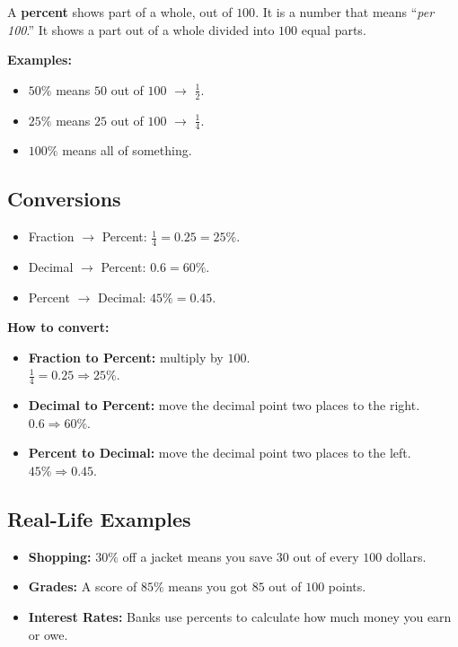 A \textbf{percent} shows part of a whole, out of \(100\). It is a number that means
``\emph{per 100}.'' It shows a part out of a whole divided into \(100\) equal parts.

\textbf{Examples:}
\begin{itemize}
  \item \(50\%\) means \(50\) out of \(100\) \(\rightarrow\) \(\frac{1}{2}\).
  \item \(25\%\) means \(25\) out of \(100\) \(\rightarrow\) \(\frac{1}{4}\).
  \item \(100\%\) means all of something.
\end{itemize}

\subsection{Conversions}

\begin{itemize}
  \item Fraction \(\rightarrow\) Percent: \(\displaystyle \frac{1}{4}=0.25=25\%\).
  \item Decimal \(\rightarrow\) Percent: \(0.6 = 60\%\).
  \item Percent \(\rightarrow\) Decimal: \(45\% = 0.45\).
\end{itemize}

\textbf{How to convert:}
\begin{itemize}
  \item \textbf{Fraction to Percent:} multiply by \(100\).\\
    \(\displaystyle \frac{1}{4}=0.25 \Rightarrow 25\%\).
  \item \textbf{Decimal to Percent:} move the decimal point two places to the right.\\
    \(0.6 \Rightarrow 60\%\).
  \item \textbf{Percent to Decimal:} move the decimal point two places to the left.\\
    \(45\% \Rightarrow 0.45\).
\end{itemize}

\subsection{Real-Life Examples}

\begin{itemize}
  \item \textbf{Shopping:} \(30\%\) off a jacket means you save \(30\) out of every \(100\) dollars.
  \item \textbf{Grades:} A score of \(85\%\) means you got \(85\) out of \(100\) points.
  \item \textbf{Interest Rates:} Banks use percents to calculate how much money you earn or owe.
\end{itemize}

